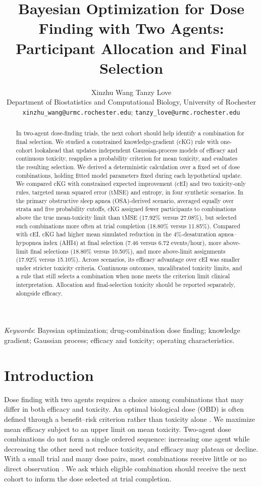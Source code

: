 \documentclass[11pt]{article}
\title{\bfseries Bayesian Optimization for Dose Finding with Two Agents: Participant Allocation and Final Selection}
\author{Xinzhu Wang \quad Tanzy Love\\[2pt]
  \small Department of Biostatistics and Computational Biology, University of Rochester\\
  \small \texttt{xinzhu\_wang@urmc.rochester.edu}; \texttt{tanzy\_love@urmc.rochester.edu}}
\date{}
\newcommand{\rev}[1]{{#1}}
\begin{document}
\maketitle

\begin{abstract}
\rev{\noindent In two-agent dose-finding trials, the next cohort should help identify a combination for final selection. We studied a constrained knowledge-gradient (cKG) rule with one-cohort lookahead that updates independent Gaussian-process models of efficacy and continuous toxicity, reapplies a probability criterion for mean toxicity, and evaluates the resulting selection. We derived a deterministic calculation over a fixed set of dose combinations, holding fitted model parameters fixed during each hypothetical update. We compared cKG with constrained expected improvement (cEI) and two toxicity-only rules, targeted mean squared error (tMSE) and entropy, in four synthetic scenarios. In the primary obstructive sleep apnea (OSA)-derived scenario, averaged equally over strata and five probability cutoffs, cKG assigned fewer participants to combinations above the true mean-toxicity limit than tMSE (17.92\% versus 27.08\%), but selected such combinations more often at trial completion (18.80\% versus 11.85\%). Compared with cEI, cKG had higher mean simulated reduction in the 4\%-desaturation apnea--hypopnea index (AHI4) at final selection (7.46 versus 6.72 events/hour), more above-limit final selections (18.80\% versus 10.50\%), and more above-limit assignments (17.92\% versus 15.10\%). Across scenarios, its efficacy advantage over cEI was smaller under stricter toxicity criteria. Continuous outcomes, uncalibrated toxicity limits, and a rule that still selects a combination when none meets the criterion limit clinical interpretation. Allocation and final-selection toxicity should be reported separately, alongside efficacy.}
\end{abstract}

\noindent\textit{Keywords}: Bayesian optimization; drug-combination dose finding; knowledge gradient;
Gaussian process; efficacy and toxicity; operating characteristics.

\section{Introduction}

Dose finding with two agents requires a choice among combinations that may differ in both efficacy and toxicity. An optimal biological dose (OBD) is often defined through a benefit--risk criterion rather than toxicity alone \citep{thall2004,kessels2026}. \rev{We maximize mean efficacy subject to an upper limit on mean toxicity.} Two-agent dose combinations do not form a single ordered sequence: increasing one agent while decreasing the other \rev{need not reduce toxicity}, and efficacy may plateau or decline. With a small trial and many dose pairs, most combinations receive little or no direct observation \citep{riviere2015,willard2025}. We ask which eligible combination should receive the next cohort to inform the dose selected at trial completion.
\end{document}
